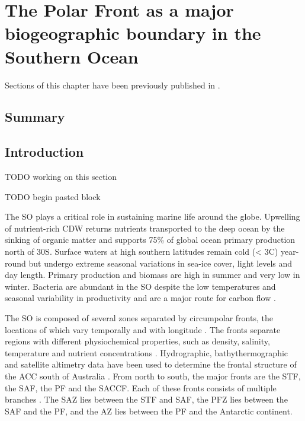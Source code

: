 \chapter{The Polar Front as a major biogeographic boundary in the Southern Ocean} 
\label{ch:polarfront}

Sections of this chapter have been previously published in .

\section{Summary}

\section{Introduction}
TODO working on this section

TODO begin pasted block

The \ac{SO} plays a critical role in sustaining marine life around the globe.
Upwelling of nutrient-rich \ac{CDW} returns nutrients transported to the deep ocean by the sinking of organic matter \cite{Rath:1998wm} and supports 75\% of global ocean primary production north of 30\textdegree{}S.
Surface waters at high southern latitudes remain cold (< 3\textdegree{}C) year-round but undergo extreme seasonal variations in sea-ice cover, light levels and day length.
Primary production and biomass are high in summer and very low in winter.
Bacteria are abundant in the \ac{SO} despite the low temperatures and seasonal variability in productivity and are a major route for carbon flow \cite{Hessen:2004vq}.

The \ac{SO} is composed of several zones separated by circumpolar fronts, the locations of which vary temporally and with longitude \cite{Whitworth:1980wo,Orsi:1995va,Sokolov:2002tc}.
The fronts separate regions with different physiochemical properties, such as density, salinity, temperature and nutrient concentrations \cite{Sokolov:2002tc}.
Hydrographic, bathythermographic and satellite altimetry data have been used to determine the frontal structure of the \ac{ACC} south of Australia \cite{Sokolov:2002tc}.
From north to south, the major fronts are the \ac{STF}, the \ac{SAF}, the \ac{PF} and the \ac{SACCF}.
Each of these fronts consists of multiple branches \cite{Sokolov:2002tc,Sokolov:2009wp,Sokolov:2009bd}.
The \ac{SAZ} lies between the \ac{STF} and \ac{SAF}, the \ac{PFZ} lies between the \ac{SAF} and the \ac{PF}, and the \ac{AZ} lies between the \ac{PF} and the Antarctic continent.

